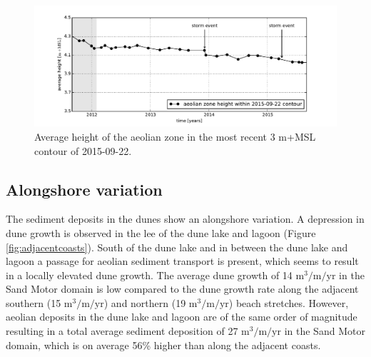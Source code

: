 
\begin{figure}
  \centering
  \includegraphics[width=\columnwidth]{../Figures/heights}
  \caption{Average height of the aeolian zone in the most recent 3
    m+MSL contour of 2015-09-22.}
  \label{fig:heights}
\end{figure}



\subsection{Alongshore variation}

The sediment deposits in the dunes show an alongshore variation. A
depression in dune growth is observed in the lee of the dune lake and
lagoon (Figure \ref{fig:adjacentcoasts}). South of the dune lake and
in between the dune lake and lagoon a passage for aeolian sediment
transport is present, which seems to result in a locally elevated dune
growth. The average dune growth of 14 $\mathrm{m^3/m/yr}$ in the Sand
Motor domain is low compared to the dune growth rate along the
adjacent southern (15 $\mathrm{m^3/m/yr}$) and northern (19
$\mathrm{m^3/m/yr}$) beach stretches.  However, aeolian deposits in
the dune lake and lagoon are of the same order of magnitude resulting
in a total average sediment deposition of 27 $\mathrm{m^3/m/yr}$ in
the Sand Motor domain, which is on average 56\% higher than along the
adjacent coasts.

